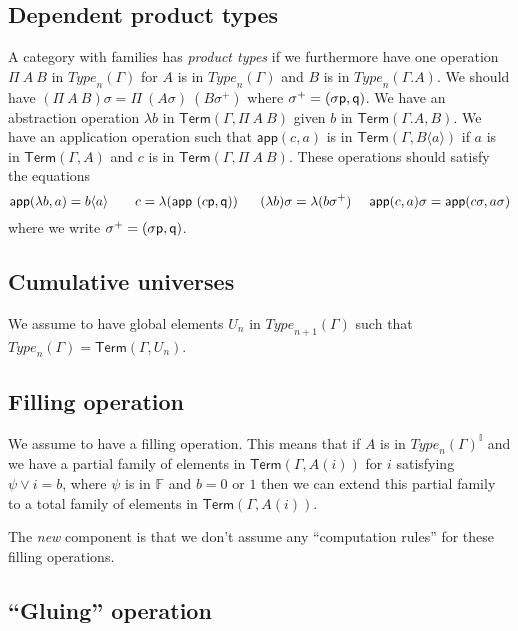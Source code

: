 \documentclass[10pt,a4paper]{article}
\newcommand{\II}{\mathbb{I}}
\newcommand{\pp}{\mathsf{p}}
\newcommand{\FF}{\mathbb{F}}
\def\Type{{Type}}
\newcommand{\app}{\mathsf{app}}
\newcommand{\subst}[1]{{\langle}#1{\rangle}}
\newcommand{\APP}[2]{\mathsf{app}(#1,#2)}
\newcommand{\Elem}{\mathsf{Term}}
\newcommand{\qq}{{\sf q}}
\begin{document}
\subsection{Dependent product types}

 A category with families has {\em product types}
if we furthermore have one operation $\Pi~A~B$ in
$\Type_n(\Gamma)$ for $A$ is in $\Type_n(\Gamma)$ and $B$ is in $\Type_n(\Gamma.A)$.
We should have $(\Pi~A~B)\sigma = \Pi~(A\sigma)~(B\sigma^+)$
where $\sigma^+ = (\sigma\pp,\qq)$.
We have an abstraction operation $\lambda b$ in  $\Elem(\Gamma,\Pi~A~B)$ given
$b$ in $\Elem(\Gamma.A,B)$.
We have an application operation such that $\app(c,a)$ is in $\Elem(\Gamma,B\subst{a})$ if
$a$ is in $\Elem(\Gamma,A)$ and $c$ is in $\Elem(\Gamma,\Pi~A~B)$.
These operations should satisfy the equations
$$
\APP{\lambda b}{a} = b\subst{a}~~~~~~c = \lambda (\app~(c\pp,\qq))~~~~~
(\lambda b)\sigma = \lambda (b\sigma^+)~~~~
\APP{c}{a}\sigma = \APP{c\sigma}{a\sigma}
$$
where we write $\sigma^+ = (\sigma\pp,\qq)$.


\subsection{Cumulative universes}

 We assume to have global elements $U_n$ in $\Type_{n+1}(\Gamma)$
such that $\Type_n(\Gamma) = \Elem(\Gamma,U_n)$.

\subsection{Filling operation}

 We assume to have a filling operation. This means that if $A$ is in $\Type_n(\Gamma)^{\II}$
and we have a partial family of elements in $\Elem(\Gamma,A(i))$ for $i$ satisfying $\psi\vee i = b$, where
$\psi$ is in $\FF$ and $b = 0$ or $1$ then we can extend this partial family to a total family
of elements in $\Elem(\Gamma,A(i))$.

\medskip

 The {\em new} component is that we don't assume any ``computation rules'' for these filling operations.

\subsection{``Gluing'' operation}
\end{document}
